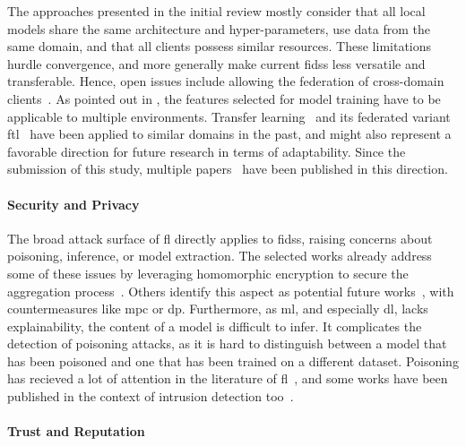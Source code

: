 The approaches presented in the initial review mostly consider that all local models share the same architecture and hyper-parameters, use data from the same domain, and that all clients possess similar resources.
These limitations hurdle convergence, and more generally make current \glspl{fids} less versatile and transferable.
Hence, open issues include allowing the federation of cross-domain clients~\cite{li_DeepFedFederatedDeep_2020}.
As pointed out in , the features selected for model training have to be applicable to multiple environments.
Transfer learning~\cite{saha_FederatedTransferLearning_2021,shen_DistributedMachineLearning_2020} and its federated variant \gls{ftl}~\cite{chen_IntrusionDetectionWireless_2020,fan_IoTDefenderFederatedTransfer_2020} have been applied to similar domains in the past, and might also represent a favorable direction for future research in terms of adaptability.
Since the submission of this study, multiple papers~\cite{otoum_FederatedTransferLearningBased_2021,khoa_DeepTransferLearning_2021,cheng_FederatedTransferLearning_2022} have been published in this direction.


\paragraph{Security and Privacy}

The broad attack surface of \gls{fl} directly applies to \glspl{fids}, raising concerns about poisoning, inference, or model extraction.
The selected works already address some of these issues by leveraging homomorphic encryption to secure the aggregation process~\cite{li_DeepFedFederatedDeep_2020,li_DistributedNetworkIntrusion_2020}. 
Others identify this aspect as potential future works~\cite{chen_IntrusionDetectionWireless_2020}, with countermeasures like \gls{mpc} or \gls{dp}.
Furthermore, as \gls{ml}, and especially \gls{dl}, lacks explainability, the content of a model is difficult to infer. 
It complicates the detection of poisoning attacks, as it is hard to distinguish between a model that has been poisoned and one that has been trained on a different dataset.
Poisoning has recieved a lot of attention in the literature of \gls{fl}~\cite{fung_LimitationsFederatedLearning_2020,nguyen_PoisoningAttacksFederated_2020b,nguyen_FLAMETamingBackdoors_2022}, and some works have been published in the context of intrusion detection too~\cite{yang_Dependablefederatedlearning_2023,merzouk_Parameterizingpoisoningattacks_2023}.


\paragraph{Trust and Reputation}

